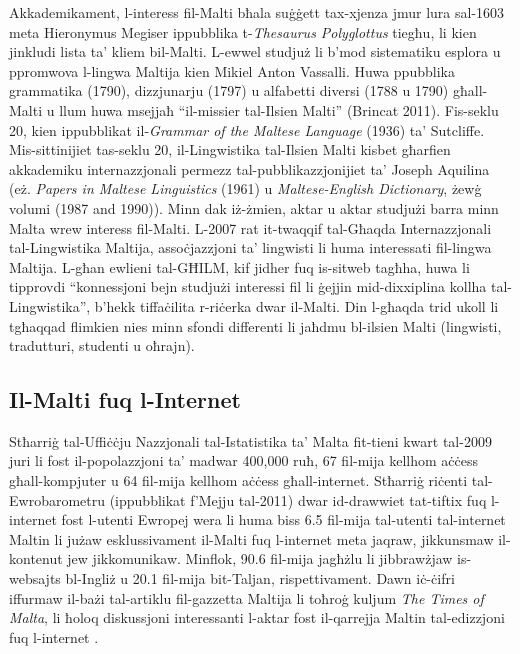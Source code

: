 \documentclass[]{../../metanetpaper}
\begin{document}
\begin{multicols}{2}
Akkademikament, l-interess fil-Malti bħala suġġett tax-xjenza jmur lura sal-1603 meta Hieronymus Megiser ippubblika t-\emph{Thesaurus Polyglottus} tiegħu, li kien jinkludi lista ta’ kliem bil-Malti. L-ewwel studjuż li b’mod sistematiku esplora u ppromwova l-lingwa Maltija kien Mikiel Anton Vassalli. Huwa ppubblika grammatika (1790), dizzjunarju (1797) u alfabetti diversi (1788 u 1790) għall-Malti u llum huwa msejjaħ ``il-missier tal-Ilsien Malti'' (Brincat 2011). Fis-seklu 20, kien ippubblikat il-\emph{Grammar of the Maltese Language} (1936) ta’ Sutcliffe. Mis-sittinijiet tas-seklu 20, il-Lingwistika tal-Ilsien Malti kisbet għarfien akkademiku internazzjonali permezz tal-pubblikazzjonijiet ta’ Joseph Aquilina (eż. \emph{Papers in Maltese Linguistics} (1961) u \emph{Maltese-English Dictionary}, żewġ volumi (1987 and 1990)).  Minn dak iż-żmien, aktar u aktar studjużi barra minn Malta wrew interess fil-Malti. L-2007 rat it-twaqqif tal-Għaqda Internazzjonali tal-Lingwistika Maltija\cite{GHILM2}, assoċjazzjoni ta’ lingwisti li huma interessati fil-lingwa Maltija. L-għan ewlieni tal-GĦILM, kif jidher fuq is-sitweb tagħha, huwa li tipprovdi ``konnessjoni bejn studjużi interessi fil li ġejjin mid-dixxiplina kollha tal-Lingwistika'', b'hekk tiffaċilita r-riċerka dwar il-Malti. Din l-għaqda trid ukoll li tgħaqqad flimkien nies minn sfondi differenti li jaħdmu bl-ilsien Malti (lingwisti, tradutturi, studenti u oħrajn).

\subsection{Il-Malti fuq l-Internet}

Stħarriġ tal-Uffiċċju Nazzjonali tal-Istatistika ta’ Malta fit-tieni kwart tal-2009 \cite{NSO2} juri li fost il-popolazzjoni ta’ madwar 400,000 ruħ, 67 fil-mija kellhom aċċess għall-kompjuter u 64 fil-mija kellhom aċċess għall-internet. Stħarriġ riċenti tal-Ewrobarometru (ippubblikat f'Mejju tal-2011) \cite{Eurobarometer1} dwar id-drawwiet tat-tiftix fuq l-internet fost l-utenti Ewropej wera li huma biss 6.5 fil-mija tal-utenti tal-internet Maltin li jużaw esklussivament il-Malti fuq l-internet meta jaqraw, jikkunsmaw il-kontenut jew jikkomunikaw. Minflok, 90.6 fil-mija jagħżlu li jibbrawżjaw is-websajts bl-Ingliż u 20.1 fil-mija bit-Taljan, rispettivament. Dawn iċ-ċifri iffurmaw il-bażi tal-artiklu fil-gazzetta Maltija li toħroġ kuljum \emph{The Times of Malta}, li ħoloq diskussjoni interessanti l-aktar fost il-qarrejja Maltin tal-edizzjoni fuq l-internet \cite{TimesOfMalta1}.
    

\end{multicols}
\end{document}
